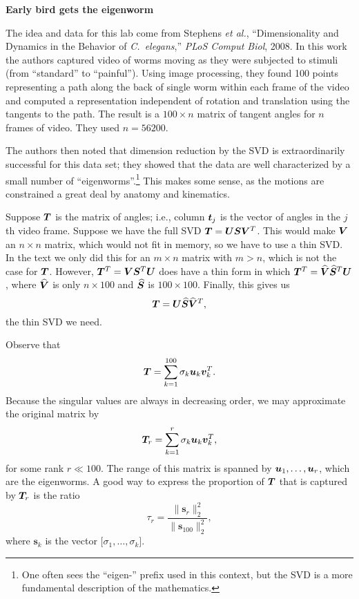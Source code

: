 \documentclass[11pt,twoside]{article}
\begin{document}
\begin{center}
  \bf Early bird gets the eigenworm
\end{center}

The idea and data for this lab come from Stephens \textit{et al.}, ``Dimensionality and Dynamics in the Behavior of \textit{C.\ elegans},'' \textit{PLoS Comput Biol}, 2008. In this work the authors captured video of worms moving as they were subjected to stimuli (from ``standard'' to ``painful''). Using image processing, they found 100 points representing a path along the back of single worm within each frame of the video and computed a representation independent of rotation and translation using the tangents to the path. The result is a $100\times n$ matrix of tangent angles for $n$ frames of video. They used $n=56200$.

The authors then noted that dimension reduction by the SVD is extraordinarily successful for this data set; they showed that the data are well characterized by a small number of ``eigenworms''.\footnote{One often sees the ``eigen-'' prefix used in this context, but the SVD is a more fundamental description of the mathematics.} This makes some sense, as the motions are constrained a great deal by anatomy and kinematics. 

Suppose $\bm{T}$ is the matrix of angles; i.e., column $\bm{t}_j$ is the vector of angles in the $j$th video frame. Suppose we have the full SVD $\bm{T}=\bm{U} \bm{S} \bm{V}^T$. This would make $\bm{V}$ an $n\times n$ matrix, which would not fit in memory, so we have to use a thin SVD. In the text we only did this for an $m\times n$ matrix with $m>n$, which is not the case for $\bm{T}$. However, $\bm{T}^T=\bm{V} \bm{S}^T \bm{U}$ does have a thin form in which $\bm{T}^T=\widehat{\bm{V}} \widehat{\bm{S}}^T \bm{U}$, where $\widehat{\bm{V}}$ is only $n\times 100$ and $\widehat{\bm{S}}$ is $100\times 100$. Finally, this gives us
\begin{equation}
  \label{eq:reducesvd}
  \bm{T}=\bm{U} \widehat{\bm{S}} \widehat{\bm{V}}^T,
\end{equation}
the thin SVD we need. 

Observe that
\begin{equation}
  \bm{T} = \sum_{k=1}^{100} \sigma_k \bm{u}_k \bm{v}_k^T.
\end{equation}
Because the singular values are always in decreasing order, we may approximate the original matrix by
\begin{equation}
  \bm{T}_r = \sum_{k=1}^{r} \sigma_k \bm{u}_k \bm{v}_k^T,
\end{equation}
for some rank $r\ll 100$.  The range of this matrix is spanned by $\bm{u}_1,\ldots,\bm{u}_r$, which are the eigenworms. A good way to express the proportion of $\bm{T}$ that is captured by $\bm{T}_r$ is the ratio
\begin{equation}
  \tau_r = \frac{\|\mathbf{s}_r\|^2_2}{\|\mathbf{s}_{100}\|^2_2},
\end{equation}
where $\mathbf{s}_k$ is the vector $\bigl[ \sigma_1,\ldots,\sigma_k \bigr]$.
\end{document}
